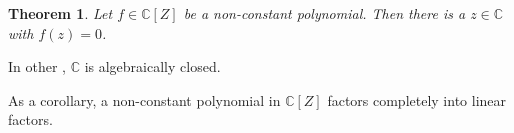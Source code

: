 \documentclass{article}
\begin{document}
\newtheorem*{thm}{Theorem}
\begin{thm}
Let $f \in \mathbb{C}[Z]$ be a non-constant polynomial.  Then there is a $z\in\mathbb{C}$ with $f(z)=0$.
\end{thm}

In other , $\mathbb{C}$ is algebraically closed.

As a corollary, a non-constant polynomial in $\mathbb{C}[Z]$ factors completely
into linear factors. 
\end{document}
